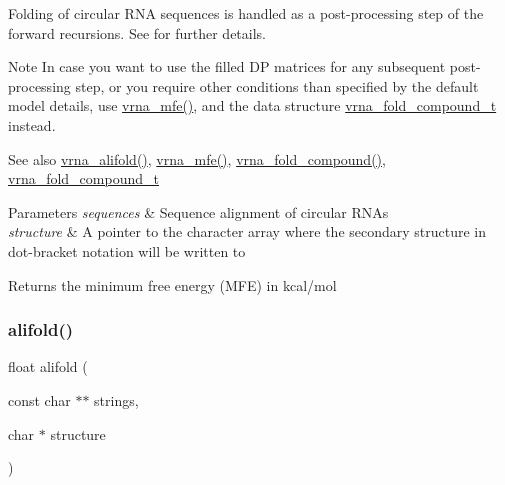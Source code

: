 Folding of circular R\+NA sequences is handled as a post-\/processing step of the forward recursions. See \cite{hofacker:2006} for further details.

\begin{DoxyNote}{Note}
In case you want to use the filled DP matrices for any subsequent post-\/processing step, or you require other conditions than specified by the default model details, use \hyperlink{group__mfe__fold_gabd3b147371ccf25c577f88bbbaf159fd}{vrna\+\_\+mfe()}, and the data structure \hyperlink{group__fold__compound_ga1b0cef17fd40466cef5968eaeeff6166}{vrna\+\_\+fold\+\_\+compound\+\_\+t} instead.
\end{DoxyNote}
\begin{DoxySeeAlso}{See also}
\hyperlink{group__consensus__mfe__fold_ga6c9d3bef3e92c6d423ffac9f981418c1}{vrna\+\_\+alifold()}, \hyperlink{group__mfe__fold_gabd3b147371ccf25c577f88bbbaf159fd}{vrna\+\_\+mfe()}, \hyperlink{group__fold__compound_ga6601d994ba32b11511b36f68b08403be}{vrna\+\_\+fold\+\_\+compound()}, \hyperlink{group__fold__compound_ga1b0cef17fd40466cef5968eaeeff6166}{vrna\+\_\+fold\+\_\+compound\+\_\+t}
\end{DoxySeeAlso}

\begin{DoxyParams}{Parameters}
{\em sequences} & Sequence alignment of circular R\+N\+As \\
\hline
{\em structure} & A pointer to the character array where the secondary structure in dot-\/bracket notation will be written to \\
\hline
\end{DoxyParams}
\begin{DoxyReturn}{Returns}
the minimum free energy (M\+FE) in kcal/mol 
\end{DoxyReturn}
\mbox{\label{group__consensus__mfe__fold_ga4cf00f0659e5f0480335d69e797f05b1}} 
\subsubsection{\texorpdfstring{alifold()}{alifold()}}
{\footnotesize\ttfamily float alifold (\begin{DoxyParamCaption}\item[{const char $\ast$$\ast$}]{strings,  }\item[{char $\ast$}]{structure }\end{DoxyParamCaption})}



